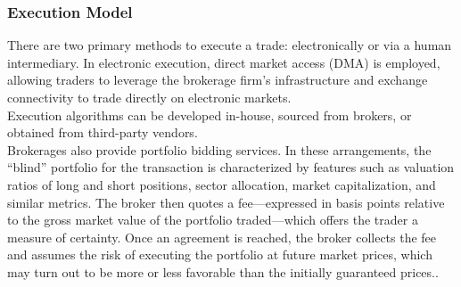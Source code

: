 \subsubsection{Execution Model}

There are two primary methods to execute a trade: electronically or via a human intermediary. In electronic execution, direct market access (DMA) is employed, allowing traders to leverage the brokerage firm’s infrastructure and exchange connectivity to trade directly on electronic markets.\\
Execution algorithms can be developed in-house, sourced from brokers, or obtained from third-party vendors.\\
Brokerages also provide portfolio bidding services. In these arrangements, the “blind” portfolio for the transaction is characterized by features such as valuation ratios of long and short positions, sector allocation, market capitalization, and similar metrics. The broker then quotes a fee—expressed in basis points relative to the gross market value of the portfolio traded—which offers the trader a measure of certainty. Once an agreement is reached, the broker collects the fee and assumes the risk of executing the portfolio at future market prices, which may turn out to be more or less favorable than the initially guaranteed prices..

